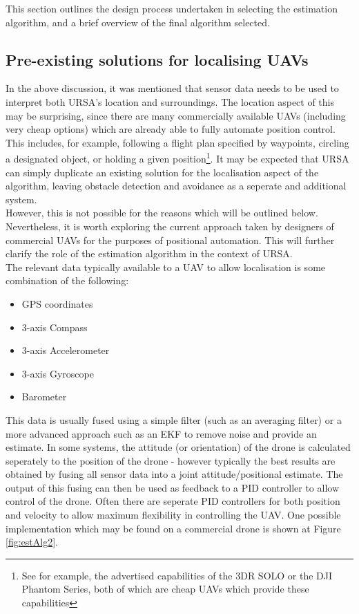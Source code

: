 \documentclass[capstone_report.tex]{subfiles}
\begin{document}
This section outlines the design process undertaken in selecting the estimation algorithm, and a brief overview of the final algorithm selected. 

\subsection{Pre-existing solutions for localising UAVs}
In the above discussion, it was mentioned that sensor data needs to be used to interpret both URSA's location and surroundings. The location aspect of this may be surprising, since there are many commercially available UAVs (including very cheap options) which are already able to fully automate position control. This includes, for example, following a flight plan specified by waypoints, circling a designated object, or holding a given position\footnote{See for example, the advertised capabilities of the 3DR SOLO or the DJI Phantom Series, both of which are cheap UAVs which provide these capabilities}. It may be expected that URSA can simply duplicate an existing solution for the localisation aspect of the algorithm, leaving obstacle detection and avoidance as a seperate and additional system.\\

However, this is not possible for the reasons which will be outlined below. Nevertheless, it is worth exploring the current approach taken by designers of commercial UAVs for the purposes of positional automation. This will further clarify the role of the estimation algorithm in the context of URSA.\\

The relevant data typically available to a UAV to allow localisation is some combination of the following:
\begin{itemize}
	\item GPS coordinates
	\item 3-axis Compass
	\item 3-axis Accelerometer
	\item 3-axis Gyroscope
	\item Barometer
\end{itemize}

This data is usually fused using a simple filter (such as an averaging filter) or a more advanced approach such as an EKF to remove noise and provide an estimate. In some systems, the attitude (or orientation) of the drone is calculated seperately to the position of the drone - however typically the best results are obtained by fusing all sensor data into a joint attitude/positional estimate. The output of this fusing can then be used as feedback to a PID controller to allow control of the drone. Often there are seperate PID controllers for both position and velocity to allow maximum flexibility in controlling the UAV. One possible implementation which may be found on a commercial drone is shown at Figure \ref{fig:estAlg2}. \\
\end{document}
